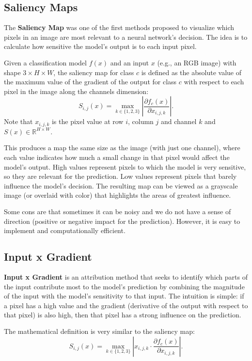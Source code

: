 \subsection{Saliency Maps}

The \textbf{Saliency Map} was one of the first methods proposed to visualize which pixels in an image are most relevant to a neural network's decision. The idea is to calculate how sensitive the model's output is to each input pixel.

Given a classification model $f(x)$ and an input $x$ (e.g., an RGB image) with shape $3\times H\times W$, the saliency map for class $c$ is defined as the absolute value of the maximum value of the gradient of the output for class $c$ with respect to each pixel in the image along the channels dimension:
$$S_{i, j}(x)=\max_{k\in\{1, 2, 3\}}\left|\dfrac{\partial f_c(x)}{\partial x_{i, j, k}}\right|.$$
Note that $x_{i, j, k}$ is the pixel value at row $i$, column $j$ and channel $k$ and $S(x)\in\mathbb{R}^{H\times W}$.

This produces a map the same size as the image (with just one channel), where each value indicates how much a small change in that pixel would affect the model's output. High values represent pixels to which the model is very sensitive, so they are relevant for the prediction. Low values represent pixels that barely influence the model's decision. The resulting map can be viewed as a grayscale image (or overlaid with color) that highlights the areas of greatest influence.

Some cons are that sometimes it can be noisy and we do not have a sense of direction (positive or negative impact for the prediction). However, it is easy to implement and computationally efficient.

\subsection{Input x Gradient}

\textbf{Input x Gradient} is an attribution method that seeks to identify which parts of the input contribute most to the model's prediction by combining the magnitude of the input with the model's sensitivity to that input. The intuition is simple: if a pixel has a high value and the gradient (derivative of the output with respect to that pixel) is also high, then that pixel has a strong influence on the prediction.

The mathematical definition is very similar to the saliency map:
$$S_{i, j}(x)=\max_{k\in\{1, 2, 3\}}\left|x_{i, j, k}\cdot \dfrac{\partial f_c(x)}{\partial x_{i, j, k}}\right|.$$

